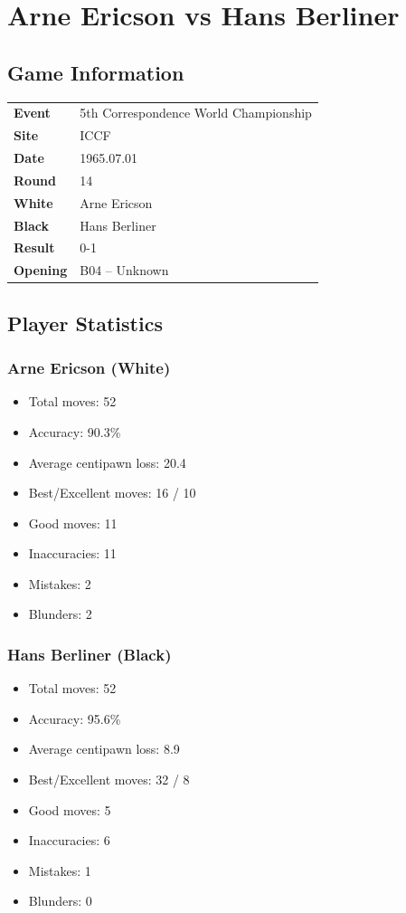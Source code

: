 \documentclass[11pt]{book}
\begin{document}
\chapter{Arne Ericson vs Hans Berliner}

\section{Game Information}
\begin{tabular}{ll}
\textbf{Event} & 5th Correspondence World Championship \\
\textbf{Site} & ICCF \\
\textbf{Date} & 1965.07.01 \\
\textbf{Round} & 14 \\
\textbf{White} & Arne Ericson \\
\textbf{Black} & Hans Berliner \\
\textbf{Result} & 0-1 \\
\textbf{Opening} & B04 -- Unknown \\
\end{tabular}

\section{Player Statistics}

\subsection{Arne Ericson (White)}
\begin{itemize}
\item Total moves: 52
\item Accuracy: 90.3\%
\item Average centipawn loss: 20.4
\item Best/Excellent moves: 16 / 10
\item Good moves: 11
\item Inaccuracies: 11
\item Mistakes: 2
\item Blunders: 2
\end{itemize}

\subsection{Hans Berliner (Black)}
\begin{itemize}
\item Total moves: 52
\item Accuracy: 95.6\%
\item Average centipawn loss: 8.9
\item Best/Excellent moves: 32 / 8
\item Good moves: 5
\item Inaccuracies: 6
\item Mistakes: 1
\item Blunders: 0
\end{itemize}
\end{document}
